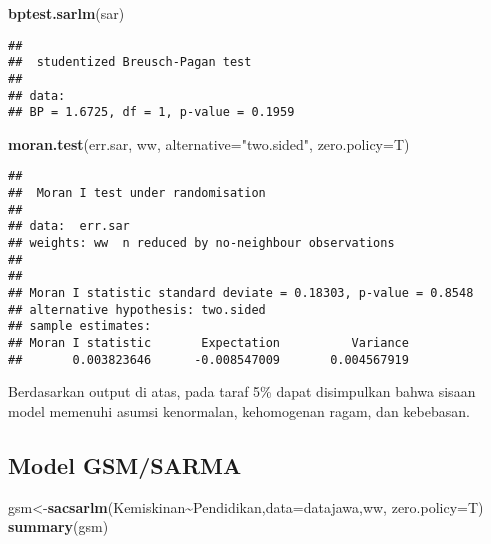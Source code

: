 \documentclass[
]{book}
\newenvironment{Shaded}{\begin{snugshade}}{\end{snugshade}}
\newcommand{\DataTypeTok}[1]{\textcolor[rgb]{0.13,0.29,0.53}{#1}}
\newcommand{\KeywordTok}[1]{\textcolor[rgb]{0.13,0.29,0.53}{\textbf{#1}}}
\newcommand{\NormalTok}[1]{#1}
\newcommand{\OperatorTok}[1]{\textcolor[rgb]{0.81,0.36,0.00}{\textbf{#1}}}
\newcommand{\StringTok}[1]{\textcolor[rgb]{0.31,0.60,0.02}{#1}}
\begin{document}
\begin{Shaded}
\begin{Highlighting}[]
\KeywordTok{bptest.sarlm}\NormalTok{(sar)}
\end{Highlighting}
\end{Shaded}

\begin{verbatim}
## 
##  studentized Breusch-Pagan test
## 
## data:  
## BP = 1.6725, df = 1, p-value = 0.1959
\end{verbatim}

\begin{Shaded}
\begin{Highlighting}[]
\KeywordTok{moran.test}\NormalTok{(err.sar, ww, }\DataTypeTok{alternative=}\StringTok{"two.sided"}\NormalTok{, }\DataTypeTok{zero.policy=}\NormalTok{T)}
\end{Highlighting}
\end{Shaded}

\begin{verbatim}
## 
##  Moran I test under randomisation
## 
## data:  err.sar  
## weights: ww  n reduced by no-neighbour observations
##   
## 
## Moran I statistic standard deviate = 0.18303, p-value = 0.8548
## alternative hypothesis: two.sided
## sample estimates:
## Moran I statistic       Expectation          Variance 
##       0.003823646      -0.008547009       0.004567919
\end{verbatim}

Berdasarkan output di atas, pada taraf 5\% dapat disimpulkan bahwa sisaan model memenuhi asumsi kenormalan, kehomogenan ragam, dan kebebasan.

\hypertarget{model-gsmsarma}{%
\subsection{Model GSM/SARMA}\label{model-gsmsarma}}

\begin{Shaded}
\begin{Highlighting}[]
\NormalTok{gsm\textless{}{-}}\KeywordTok{sacsarlm}\NormalTok{(Kemiskinan}\OperatorTok{\textasciitilde{}}\NormalTok{Pendidikan,}\DataTypeTok{data=}\NormalTok{datajawa,ww, }\DataTypeTok{zero.policy=}\NormalTok{T)}
\KeywordTok{summary}\NormalTok{(gsm)}
\end{Highlighting}
\end{Shaded}
\end{document}
